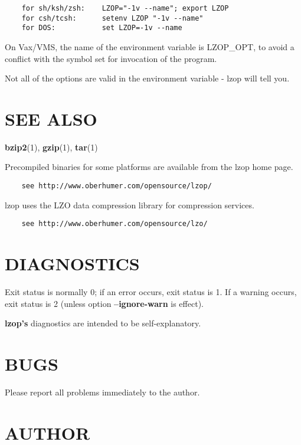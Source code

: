 \begin{verbatim}
    for sh/ksh/zsh:    LZOP="-1v --name"; export LZOP
    for csh/tcsh:      setenv LZOP "-1v --name"
    for DOS:           set LZOP=-1v --name
\end{verbatim}


On Vax/VMS, the name of the environment variable is
LZOP\_OPT, to avoid a conflict with the symbol set for
invocation of the program.



Not all of the options are valid in the environment variable -
lzop will tell you.

\section{SEE ALSO\label{SEE_ALSO}}


\textbf{bzip2}(1), \textbf{gzip}(1), \textbf{tar}(1)



Precompiled binaries for some platforms are available
from the lzop home page.

\begin{verbatim}
    see http://www.oberhumer.com/opensource/lzop/
\end{verbatim}


lzop uses the LZO data compression library for compression
services.

\begin{verbatim}
    see http://www.oberhumer.com/opensource/lzo/
\end{verbatim}
\section{DIAGNOSTICS\label{DIAGNOSTICS}}


Exit status is normally 0; if an error occurs, exit status
is 1. If a warning occurs, exit status is 2 (unless
option \textbf{--ignore-warn} is effect).



\textbf{lzop's} diagnostics are intended to be self-explanatory.

\section{BUGS\label{BUGS}}


Please report all problems immediately to the author.

\section{AUTHOR\label{AUTHOR}}


